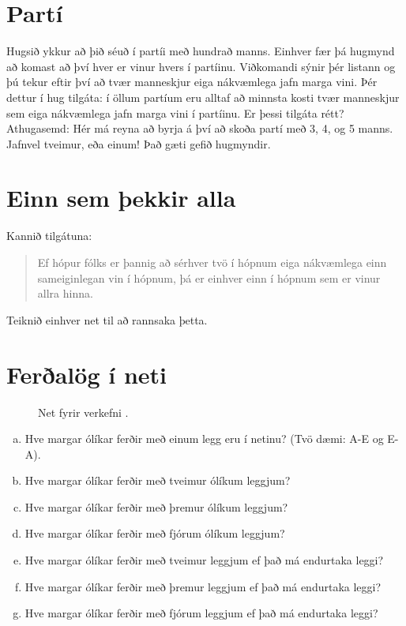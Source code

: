\documentclass[b5paper,12pt]{book}
\renewcommand*\thesection{\arabic{section}}
\begin{document}
\section{Partí}
\label{sec:skuffureglan}
Hugsið ykkur að þið séuð í partíi með hundrað manns. Einhver fær þá hugmynd að komast að því hver er vinur hvers í partíinu. Viðkomandi sýnir þér listann og þú tekur eftir því að tvær manneskjur eiga nákvæmlega jafn marga vini. Þér dettur í hug tilgáta: í öllum partíum eru alltaf að minnsta kosti tvær manneskjur sem eiga nákvæmlega jafn marga vini í partíinu. Er þessi tilgáta rétt?
Athugasemd: Hér má reyna að byrja á því að skoða partí með 3, 4, og 5 manns. Jafnvel tveimur, eða einum! Það gæti gefið hugmyndir.

\section{Einn sem þekkir alla}
Kannið tilgátuna: 
\begin{quote}
Ef hópur fólks er þannig að sérhver tvö í hópnum eiga nákvæmlega einn sameiginlegan vin í hópnum, þá er einhver einn í hópnum sem er vinur allra hinna.
\end{quote}
Teiknið einhver net til að rannsaka þetta.

\section{Ferðalög í neti}
\begin{figure}[h]
    \centering
{}
\caption*{Net fyrir verkefni \thesection{}.}
\end{figure}
\begin{enumerate}[(a)]
    \item Hve margar ólíkar ferðir með einum legg eru í netinu? (Tvö dæmi: A-E og E-A).
    \item Hve margar ólíkar ferðir með tveimur ólíkum leggjum?
    \item Hve margar ólíkar ferðir með þremur ólíkum leggjum?
    \item Hve margar ólíkar ferðir með fjórum ólíkum leggjum?
    \item Hve margar ólíkar ferðir með tveimur leggjum ef það má endurtaka leggi?
    \item Hve margar ólíkar ferðir með þremur leggjum ef það má endurtaka leggi?
    \item Hve margar ólíkar ferðir með fjórum leggjum ef það má endurtaka leggi?
\end{enumerate}
\end{document}
